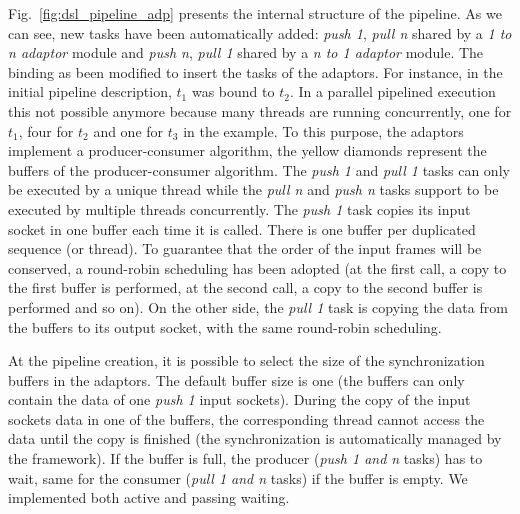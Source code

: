 Fig.~\ref{fig:dsl_pipeline_adp} presents the internal structure of the pipeline.
As we can see, new tasks have been automatically added: \emph{push 1},
\emph{pull n} shared by a \emph{1 to n adaptor} module and \emph{push n},
\emph{pull 1} shared by a \emph{n to 1 adaptor} module. The binding as been
modified to insert the tasks of the adaptors. For instance, in the initial
pipeline description, $t_1$ was bound to $t_2$. In a parallel pipelined
execution this not possible anymore because many threads are running
concurrently, one for $t_1$, four for $t_2$ and one for $t_3$ in the example. To
this purpose, the adaptors implement a producer-consumer algorithm, the yellow
diamonds represent the buffers of the producer-consumer algorithm. The
\emph{push 1} and \emph{pull 1} tasks can only be executed by a unique thread
while the \emph{pull n} and \emph{push n} tasks support to be executed by
multiple threads concurrently. The \emph{push 1} task copies its input socket in
one buffer each time it is called. There is one buffer per duplicated sequence
(or thread). To guarantee that the order of the input frames will be conserved,
a round-robin scheduling has been adopted (at the first call, a copy to the
first buffer is performed, at the second call, a copy to the second buffer is
performed and so on). On the other side, the \emph{pull 1} task is copying the
data from the buffers to its output socket, with the same round-robin
scheduling.

At the pipeline creation, it is possible to select the size of the
synchronization buffers in the adaptors. The default buffer size is one (the
buffers can only contain the data of one \emph{push 1} input sockets). During
the copy of the input sockets data in one of the buffers, the corresponding
thread cannot access the data until the copy is finished (the synchronization is
automatically managed by the framework).
If the buffer is full, the producer (\emph{push 1 and n} tasks) has to wait,
same for the consumer (\emph{pull 1 and n} tasks) if the buffer is empty. We
implemented both active and passing waiting.


